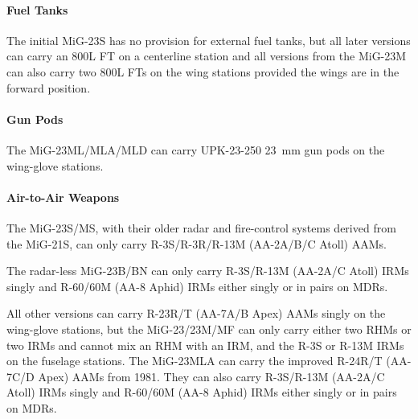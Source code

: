 \paragraph{Fuel Tanks}
The initial MiG-23S has no provision for external fuel tanks, but all later versions can carry an 800L FT on a centerline station and all versions from the MiG-23M can also carry two 800L FTs on the wing stations provided the wings are in the forward position.%

\paragraph{Gun Pods}
The MiG-23ML/MLA/MLD can carry UPK-23-250 23~mm gun pods on the wing-glove stations.%

\paragraph{Air-to-Air Weapons}
The MiG-23S/MS, with their older radar and fire-control systems derived from the MiG-21S, can only carry R-3S/R-3R/R-13M (AA-2A/B/C Atoll) AAMs.

The radar-less MiG-23B/BN can only carry R-3S/R-13M (AA-2A/C Atoll) IRMs singly and R-60/60M (AA-8 Aphid) IRMs either singly or in pairs on MDRs.

All other versions can carry R-23R/T (AA-7A/B Apex) AAMs singly on the wing-glove stations, but the MiG-23/23M/MF can only carry either two RHMs or two IRMs and cannot mix an RHM with an IRM, and the R-3S or R-13M IRMs on the fuselage stations. The MiG-23MLA can carry the improved R-24R/T (AA-7C/D Apex) AAMs from 1981. They can also carry R-3S/R-13M (AA-2A/C Atoll) IRMs singly and R-60/60M (AA-8 Aphid) IRMs either singly or in pairs on MDRs.%


